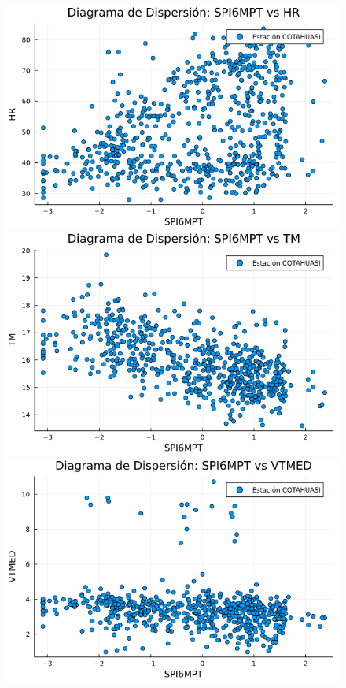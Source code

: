\begin{figure}[htbp]
\begin{minipage}{0.32\textwidth}
    \centering
    \includegraphics[width=\linewidth]{Capitulos/Scaterplot/COTAHUASI_SPI6MPT_vs_HR.png}
\end{minipage}\hfill
\begin{minipage}{0.32\textwidth}
    \centering
    \includegraphics[width=\linewidth]{Capitulos/Scaterplot/COTAHUASI_SPI6MPT_vs_TM.png}
\end{minipage}\hfill
\begin{minipage}{0.32\textwidth}
    \centering
    \includegraphics[width=\linewidth]{Capitulos/Scaterplot/COTAHUASI_SPI6MPT_vs_VTMED.png}
\end{minipage}


\end{figure}
